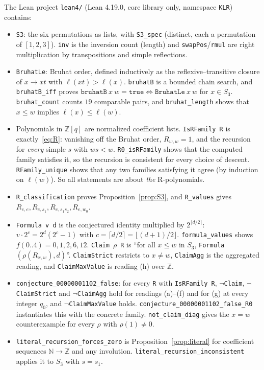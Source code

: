 \documentclass[11pt]{article}
\theoremstyle{remark}
\begin{document}
The Lean project \texttt{lean4/} (Lean 4.19.0, core library only, namespace
\texttt{KLR}) contains:
\begin{itemize}
\item \texttt{S3}: the six permutations as lists, with \texttt{S3\_spec}
(distinct, each a permutation of $[1,2,3]$). \texttt{inv} is the inversion count
(length) and \texttt{swapPos}/\texttt{rmul} are right multiplication by
transpositions and simple reflections.
\item \texttt{BruhatLe}: Bruhat order, defined inductively as the
reflexive--transitive closure of $x\to xt$ with $\ell(xt)>\ell(x)$.
\texttt{bruhatB} is a bounded chain search, and \texttt{bruhatB\_iff} proves
$\texttt{bruhatB}\ x\ w=\texttt{true}\iff\texttt{BruhatLe}\ x\ w$ for $x\in S_3$.
\texttt{bruhat\_count} counts $19$ comparable pairs, and \texttt{bruhat\_length}
shows that $x\le w$ implies $\ell(x)\le\ell(w)$.
\item Polynomials in $\mathbb Z[q]$ are normalized coefficient lists.
\texttt{IsRFamily R} is exactly~\eqref{eq:R}: vanishing off the Bruhat order,
$R_{w,w}=1$, and the recursion for \emph{every} simple $s$ with $ws<w$.
\texttt{R0\_isRFamily} shows that the computed family satisfies it, so the
recursion is consistent for every choice of descent. \texttt{RFamily\_unique}
shows that any two families satisfying it agree (by induction on $\ell(w)$).
So all statements are about \emph{the} R-polynomials.
\item \texttt{R\_classification} proves Proposition~\ref{prop:S3}, and
\texttt{R\_values} gives $R_{e,e},R_{e,s_1},R_{e,s_1s_2},R_{e,w_0}$.
\item \texttt{Formula v d} is the conjectured identity multiplied by
$2^{\lceil d/2\rceil}$: $v\cdot2^{c}=2^d(2^{c}-1)$ with
$c=\lceil d/2\rceil=\lfloor (d+1)/2\rfloor$. \texttt{formula\_values} shows
$f(0..4)=0,1,2,6,12$. \texttt{Claim}~$\rho$~\texttt{R} is ``for all $x\le w$ in
$S_3$, \texttt{Formula}$(\rho(R_{x,w}),d)$''. \texttt{ClaimStrict} restricts to
$x\ne w$, \texttt{ClaimAgg} is the aggregated reading, and
\texttt{ClaimMaxValue} is reading (h) over $\mathbb Z$.
\item \texttt{conjecture\_00000001102\_false}: for every \texttt{R} with
\texttt{IsRFamily R}, $\neg$\texttt{Claim}, $\neg$\texttt{ClaimStrict} and
$\neg$\texttt{ClaimAgg} hold for readings (a)--(f) and for (g) at every integer
$q_0$, and $\neg$\texttt{ClaimMaxValue} holds.
\texttt{conjecture\_00000001102\_false\_R0} instantiates this with the concrete
family. \texttt{not\_claim\_diag} gives the $x=w$ counterexample for every
$\rho$ with $\rho(1)\ne0$.
\item \texttt{literal\_recursion\_forces\_zero} is
Proposition~\ref{prop:literal} for coefficient sequences $\mathbb N\to\mathbb Z$
and any involution. \texttt{literal\_recursion\_inconsistent} applies it to
$S_3$ with $s=s_1$.
\end{itemize}
\end{document}
